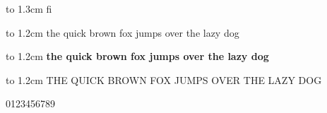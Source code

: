 \documentclass[10pt]{article}
\begin{document}
{
\hminfamily \showthe\font
}
\vbox to 1.3cm{ %
{\LARGE fi} %
}

\vbox to 1.2cm{
the quick brown fox jumps over the lazy dog
}

\vbox to 1.2cm{
\bfseries the quick brown fox jumps over the lazy dog
}

\vbox to 1.2cm{
THE QUICK BROWN FOX JUMPS OVER THE LAZY DOG
}

\vbox{
0123456789
}
\end{document}
